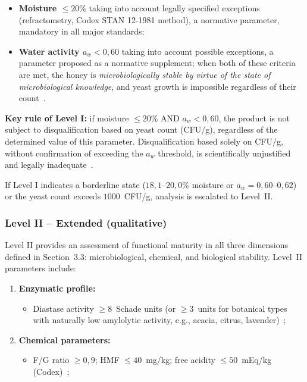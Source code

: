\begin{itemize}
    \item \textbf{Moisture $\leq 20\%$} taking into account
          legally specified exceptions (refractometry,
          Codex STAN 12-1981 method), a normative parameter,
          mandatory in all major standards;
    \item \textbf{Water activity $a_w < 0{,}60$} taking into
          account possible exceptions, a parameter proposed as
          a normative supplement; when both of these criteria
          are met, the honey is \emph{microbiologically stable
          by virtue of the state of microbiological knowledge},
          and yeast growth is impossible regardless of their
          count~\cite{ruegg1981,waaw2006}.
\end{itemize}

\textbf{Key rule of Level I:} if moisture $\leq 20\%$
\textsc{AND} $a_w < 0{,}60$, the product is not subject to
disqualification based on yeast count (CFU/g), regardless of the
determined value of this parameter. Disqualification based solely
on CFU/g, without confirmation of exceeding the $a_w$ threshold,
is scientifically unjustified and legally
inadequate~\cite{codex_stan12,eudir2001110}.

If Level I indicates a borderline state ($18{,}1$--$20{,}0\%$
moisture or $a_w = 0{,}60$--$0{,}62$) or the yeast count exceeds
$1000$~CFU/g, analysis is escalated to Level~II.

\subsubsection{Level II -- Extended (qualitative)}

Level II provides an assessment of functional maturity in all
three dimensions defined in Section~3.3: microbiological, chemical,
and biological stability. Level~II parameters include:

\begin{enumerate}
    \item \textbf{Enzymatic profile:}
    \begin{itemize}
        \item Diastase activity $\geq 8$~Schade units (or $\geq 3$~units
              for botanical types with naturally low amylolytic
              activity, e.g., acacia, citrus, lavender)~\cite{codex_stan12};
    \end{itemize}
    \item \textbf{Chemical parameters:}
    \begin{itemize}
        \item F/G ratio $\geq 0{,}9$; HMF $\leq 40$~mg/kg;
              free acidity $\leq 50$~mEq/kg
              (Codex)~\cite{codex_stan12};
    \end{itemize}
\end{enumerate}

